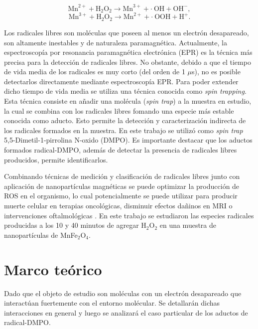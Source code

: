 \documentclass[aps,prl,reprint,superscriptaddress,showkeys]{revtex4-2}
\begin{document}
 \begin{equation}
    \text{Mn}^{2+} + \text{H}_2\text{O}_2 \longrightarrow \text{Mn}^{3+}  + \cdot ~ \text{OH} + \text{OH}^{-},
\end{equation}
\begin{equation}
    \text{Mn}^{3+} + \text{H}_2\text{O}_2 \longrightarrow \text{Mn}^{2+}  + \cdot ~ \text{OOH} + \text{H}^{+}.
\end{equation}

Los radicales libres son moléculas que poseen al menos un electrón desapareado, son altamente inestables y de naturaleza paramagnética. Actualmente, la espectroscopía por resonancia paramagnética electrónica (EPR) es la técnica más precisa para la detección de radicales libres. No obstante, debido a que el tiempo de vida media de los radicales es muy corto (del orden de 1 $\mu$s), no es posible detectarlos directamente mediante espectroscopía EPR. Para poder extender dicho tiempo de vida media se utiliza una técnica conocida como \textit{spin trapping}. Esta técnica consiste en añadir una molécula (\textit{spin trap}) a la muestra en estudio, la cual se combina con los radicales libres fomando una especie más estable conocida como aducto. Esto permite la detección y caracterización indirecta de los radicales formados en la muestra. En este trabajo se utilizó como \textit{spin trap} 5,5-Dimetil-1-pirrolina N-oxido (DMPO). Es importante destacar que los aductos formados radical-DMPO, además de detectar la presencia de radicales libres producidos, permite identificarlos. 

Combinando técnicas de medición y clasificación de radicales libres junto con aplicación de nanopartículas magnéticas se puede optimizar la producción de ROS en el organismo, lo cual potencialmente se puede utilizar para producir muerte celular en terapias oncológicas, disminuir efectos dañinos en MRI o intervenciones oftalmológicas \cite{zhou_reactive_2016, abdal_dayem_role_2017}. En este trabajo se estudiaron las especies radicales producidas a los 10 y 40 minutos de agregar H$_2$O$_2$ en una muestra de nanopartículas de MnFe$_2$O$_4$.


\section{Marco teórico \label{sec:teoriaEPR}}

Dado que el objeto de estudio son moléculas con un electrón desapareado que interactúan fuertemente con el entorno molécular. Se detallarán dichas interacciones en general y luego se analizará el caso particular de los aductos de radical-DMPO.
\end{document}
